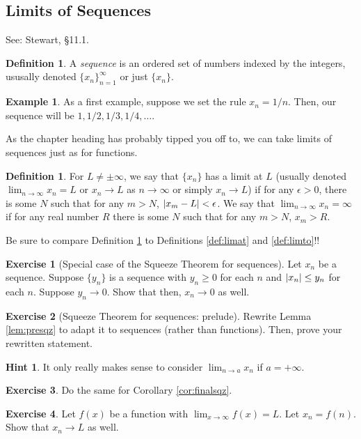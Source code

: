 \documentclass[english]{book}
\DeclarePairedDelimiter\abs{\lvert}{\rvert}%
\theoremstyle{remark}
\theoremstyle{definition}
\newtheorem{excs}{Exercise}[chapter]
\newtheorem{hint}{Hint}[excs]
\newtheorem{exle}[theorem]{Example}
\newtheorem{definition}[theorem]{Definition}
\newtheorem*{next week}{Next Week}
\newcommand{\dlim}{\displaystyle\lim}
\begin{document}
\subsection{Limits of Sequences}
See: Stewart, \S 11.1.
\begin{definition}
	A \emph{sequence} is an ordered set of numbers indexed by the integers, ususally denoted $\{x_n\}_{n=1}^\infty$ or just $\{x_n\}$.
\end{definition}
\begin{exle}
	As a first example, suppose we set the rule $x_n=1/n$. Then, our sequence will be $1,1/2,1/3,1/4,\dots$. 
\end{exle}
As the chapter heading has probably tipped you off to, we can take limits of sequences just as for functions.
\begin{definition}\label{def:seqlim}
	For $L\neq \pm \infty$, we say that $\{x_n\}$ has a limit at $L$ (usually denoted $\dlim_{n\to\infty}x_n=L$ or $x_n\to L$ as $n\to \infty$ or simply $x_n\to L$) if for any $\epsilon>0$, there is some $N$ such that for any $m>N$, $\abs{x_m-L}<\epsilon$. We say that $\dlim_{n\to \infty}x_n=\infty$ if for any real number $R$ there is some $N$ such that for any $m>N$, $x_m>R$.
	\end{definition}
Be sure to compare Definition \ref{def:seqlim} to Definitions \ref{def:limat} and \ref{def:limto}!!
\begin{excs}[Special case of the Squeeze Theorem for sequences]\label{excs:sqzseq1}
	Let ${x_n}$ be a sequence. Suppose $\{y_n\}$ is a sequence with $y_n\geq 0$ for each $n$ and $\abs{x_n}\leq y_n$ for each $n$. Suppose $y_n\to 0$. Show that then, $x_n\to 0$ as well.
\end{excs}



\begin{excs}[Squeeze Theorem for sequences: prelude]\label{excs:sqzseq2}
Rewrite Lemma \ref{lem:presqz} to adapt it to sequences (rather than functions). Then, prove your rewritten statement.
\begin{hint}
	It only really makes sense to consider $\dlim_{n\to a}x_n$ if $a=+\infty$. 
\end{hint}	
\end{excs}
\begin{excs}\label{excs:sqzseq3}
	Do the same for Corollary \ref{cor:finalsqz}.
\end{excs}

\begin{excs}\label{excs:funseq}
	Let $f(x)$ be a function with $\dlim_{x\to \infty}f(x)=L$. Let $x_n=f(n)$. Show that $x_n\to L$ as well.
\end{excs}
\end{document}
